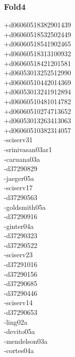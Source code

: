 \begin{multicols}{3}
\subsubsection*{Fold4}
+d06060518382901439\\
+d06060518532502449\\
+d06060518541902465\\
+d06060518313100932\\
+d06060518421201581\\
+d06053013252512990\\
+d06060510442014369\\
+d06053013241912894\\
+d06060510481014782\\
+d06060510274713652\\
+d06053013263413063\\
+d06060510382314057\\
-sciserv31\\
-srinivasan03ar1\\
-caruana03a\\
-d37290829\\
-jaeger05a\\
-sciserv17\\
-d37290563\\
-goldsmith05a\\
-d37290916\\
-ginter04a\\
-d37290323\\
-d37290522\\
-sciserv23\\
-d37291016\\
-d37290156\\
-d37290685\\
-d37290446\\
-sciserv14\\
-d37290653\\
-ling02a\\
-devito05a\\
-mendelson03a\\
-cortes04a\\

\end{multicols}
